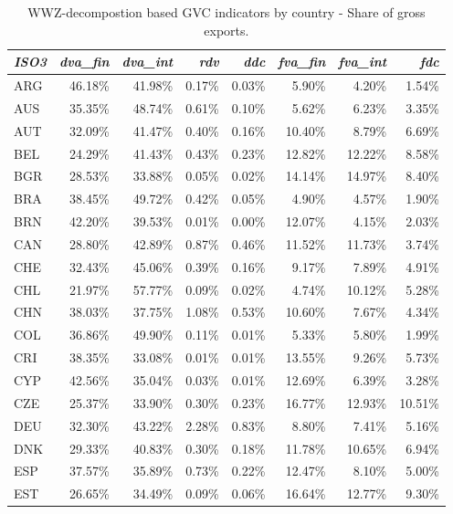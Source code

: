 \documentclass[a4paper,11pt]{article}
\begin{document}
\begin{table}[h]\small
  \centering
       \caption{WWZ-decompostion based GVC indicators by country - Share of gross exports.}
    \begin{tabular}{lrrrrrrr}
    \toprule
        \textit{ISO3} & \textit{dva\_fin} & \textit{dva\_int} & \textit{rdv} & \textit{ddc} & \textit{fva\_fin} & \textit{fva\_int} & \textit{fdc} \\
    \midrule
    ARG   & 46.18\% & 41.98\% & 0.17\% & 0.03\% & 5.90\% & 4.20\% & 1.54\% \\
    AUS   & 35.35\% & 48.74\% & 0.61\% & 0.10\% & 5.62\% & 6.23\% & 3.35\% \\
    AUT   & 32.09\% & 41.47\% & 0.40\% & 0.16\% & 10.40\% & 8.79\% & 6.69\% \\
    BEL   & 24.29\% & 41.43\% & 0.43\% & 0.23\% & 12.82\% & 12.22\% & 8.58\% \\
    BGR   & 28.53\% & 33.88\% & 0.05\% & 0.02\% & 14.14\% & 14.97\% & 8.40\% \\
    BRA   & 38.45\% & 49.72\% & 0.42\% & 0.05\% & 4.90\% & 4.57\% & 1.90\% \\
    BRN   & 42.20\% & 39.53\% & 0.01\% & 0.00\% & 12.07\% & 4.15\% & 2.03\% \\
    CAN   & 28.80\% & 42.89\% & 0.87\% & 0.46\% & 11.52\% & 11.73\% & 3.74\% \\
    CHE   & 32.43\% & 45.06\% & 0.39\% & 0.16\% & 9.17\% & 7.89\% & 4.91\% \\
    CHL   & 21.97\% & 57.77\% & 0.09\% & 0.02\% & 4.74\% & 10.12\% & 5.28\% \\
    CHN   & 38.03\% & 37.75\% & 1.08\% & 0.53\% & 10.60\% & 7.67\% & 4.34\% \\
    COL   & 36.86\% & 49.90\% & 0.11\% & 0.01\% & 5.33\% & 5.80\% & 1.99\% \\
    CRI   & 38.35\% & 33.08\% & 0.01\% & 0.01\% & 13.55\% & 9.26\% & 5.73\% \\
    CYP   & 42.56\% & 35.04\% & 0.03\% & 0.01\% & 12.69\% & 6.39\% & 3.28\% \\
    CZE   & 25.37\% & 33.90\% & 0.30\% & 0.23\% & 16.77\% & 12.93\% & 10.51\% \\
    DEU   & 32.30\% & 43.22\% & 2.28\% & 0.83\% & 8.80\% & 7.41\% & 5.16\% \\
    DNK   & 29.33\% & 40.83\% & 0.30\% & 0.18\% & 11.78\% & 10.65\% & 6.94\% \\
    ESP   & 37.57\% & 35.89\% & 0.73\% & 0.22\% & 12.47\% & 8.10\% & 5.00\% \\
    EST   & 26.65\% & 34.49\% & 0.09\% & 0.06\% & 16.64\% & 12.77\% & 9.30\% \\

\end{tabular}
\end{table}
\end{document}
